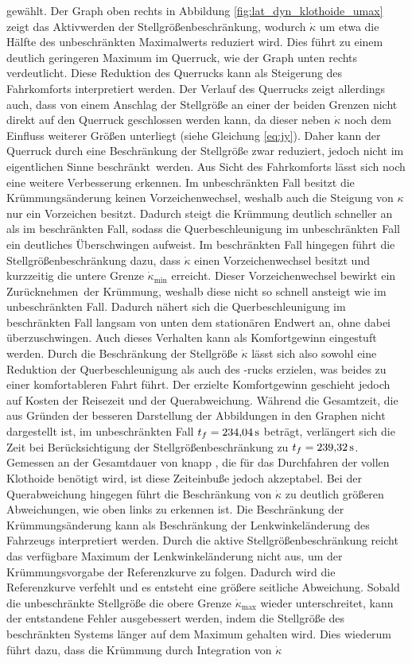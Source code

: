 gewählt. Der Graph oben rechts in Abbildung \ref{fig:lat_dyn_klothoide_umax} zeigt das Aktivwerden der Stellgrößenbeschränkung, wodurch $\dot{\kappa}$ um etwa die Hälfte des unbeschränkten Maximalwerts reduziert wird. Dies führt zu einem deutlich geringeren Maximum im Querruck, wie der Graph unten rechts verdeutlicht. Diese Reduktion des Querrucks kann als Steigerung des Fahrkomforts interpretiert werden. Der Verlauf des Querrucks zeigt allerdings auch, dass von einem Anschlag der Stellgröße an einer der beiden Grenzen nicht direkt auf den Querruck geschlossen werden kann, da dieser neben $\dot{\kappa}$ noch dem Einfluss weiterer Größen unterliegt (siehe Gleichung \eqref{eq:jy}). Daher kann der Querruck durch eine Beschränkung der Stellgröße zwar reduziert, jedoch nicht im eigentlichen Sinne \glqq beschränkt\grqq~werden. Aus Sicht des Fahrkomforts lässt sich noch eine weitere Verbesserung erkennen. Im unbeschränkten Fall besitzt die Krümmungsänderung keinen Vorzeichenwechsel, weshalb auch die Steigung von $\kappa$ nur ein Vorzeichen besitzt. Dadurch steigt die Krümmung deutlich schneller an als im beschränkten Fall, sodass die Querbeschleunigung im unbeschränkten Fall ein deutliches Überschwingen aufweist. Im beschränkten Fall hingegen führt die Stellgrößenbeschränkung dazu, dass $\dot{\kappa}$ einen Vorzeichenwechsel besitzt und kurzzeitig die untere Grenze $\dot{\kappa}_{\textrm{min}}$ erreicht. Dieser Vorzeichenwechsel bewirkt ein \glqq Zurücknehmen\grqq~der Krümmung, weshalb diese nicht so schnell ansteigt wie im unbeschränkten Fall. Dadurch nähert sich die Querbeschleunigung im beschränkten Fall langsam von unten dem stationären Endwert an, ohne dabei überzuschwingen. Auch dieses Verhalten kann als Komfortgewinn eingestuft werden. Durch die Beschränkung der Stellgröße $\dot{\kappa}$ lässt sich also sowohl eine Reduktion der Querbeschleunigung als auch des -rucks erzielen, was beides zu einer komfortableren Fahrt führt. Der erzielte Komfortgewinn geschieht jedoch auf Kosten der Reisezeit und der Querabweichung. Während die Gesamtzeit, die aus Gründen der besseren Darstellung der Abbildungen in den Graphen nicht dargestellt ist, im unbeschränkten Fall $t_f = 234{,}04\,\mathrm{s}$ beträgt, verlängert sich die Zeit bei Berücksichtigung der Stellgrößenbeschränkung zu $t_f = 239{,}32\,\mathrm{s}$. Gemessen an der Gesamtdauer von knapp , die für das Durchfahren der vollen Klothoide benötigt wird, ist diese Zeiteinbuße jedoch akzeptabel. Bei der Querabweichung hingegen führt die Beschränkung von $\dot{\kappa}$ zu deutlich größeren Abweichungen, wie oben links zu erkennen ist. Die Beschränkung der Krümmungsänderung kann als Beschränkung der Lenkwinkeländerung des Fahrzeugs interpretiert werden. Durch die aktive Stellgrößenbeschränkung reicht das verfügbare Maximum der Lenkwinkeländerung nicht aus, um der Krümmungsvorgabe der Referenzkurve zu folgen. Dadurch wird die Referenzkurve verfehlt und es entsteht eine größere seitliche Abweichung. Sobald die unbeschränkte Stellgröße die obere Grenze $\dot{\kappa}_{\textrm{max}}$ wieder unterschreitet, kann der entstandene Fehler ausgebessert werden, indem die Stellgröße des beschränkten Systems länger auf dem Maximum gehalten wird. Dies wiederum führt dazu, dass die Krümmung durch Integration von $\dot{\kappa}$ 